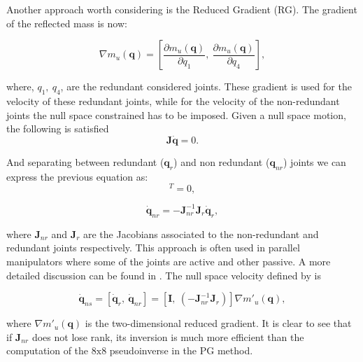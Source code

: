 Another approach worth considering is the Reduced Gradient (RG). 
The gradient of the reflected mass is now:

\begin{equation}
\nabla m_u(\mathbf{q}) = \left[
\frac{\partial {m_u(\mathbf{q})}}{\partial {q_1}}, \   \frac{\partial {m_u(\mathbf{q})}}{\partial {q_4}} \right], \label{eq:grad_refl_mass_RG}
\end{equation}

where,  $q_1 , \ q_4$,  are the redundant considered joints. These gradient is used for the velocity of these redundant joints, while for the velocity of the non-redundant joints the null space constrained has to be imposed. Given a null space motion, the following is satisfied
\begin{equation}
\mathbf{J} \dot{\mathbf{q}} = 0 .
\label{eq:ns_motion}
\end{equation}

And separating between redundant (${\mathbf{q}}_{r}$) and non redundant (${\mathbf{q}}_{nr}$) joints we can express the previous equation as:
\begin{equation}
[\mathbf{J}_r, \ \mathbf{J}_{nr}] [\mathbf{\dot{q}}_r, \  \dot{\mathbf{q}}_{nr}]^T = 0    ,
\label{eq:}
\end{equation}

\begin{equation}
\dot{\mathbf{q}}_{nr} =  - \mathbf{J}_{nr}^{-1} \mathbf{J}_r \mathbf{\dot{q}}_r    ,
\label{eq:ns_constraint}
\end{equation}

where $\mathbf{J}_{nr}$ and $\mathbf{J}_{r}$ are the Jacobians associated to the non-redundant and redundant joints respectively. This approach is often used in parallel manipulators where some of the joints are active and other passive. A more detailed discussion can be found in \cite{Murray:1994:MIR:561828}. The null space velocity defined by \cite{reduced_gradient} is

\begin{equation}
\mathbf{\dot{q}}_{ns} = \left[\mathbf{\dot{q}}_{r}, \  \mathbf{\dot{q}}_{nr} \right ] 
= \left[\mathbf{I}, \ (-\mathbf{J}_{nr}^{-1} \mathbf{J}_r)  \right ]  \nabla m'_u(\mathbf{q}),
\label{eq:ns_velocity_RG}
\end{equation}




where $\nabla m'_u(\mathbf{q})$ is the  two-dimensional reduced gradient.  It is clear to see that if $\mathbf{J}_{nr}$ does not lose rank, its inversion is much more efficient than the computation of the $\mathrm{8x8}$ pseudoinverse in the PG method. \\

